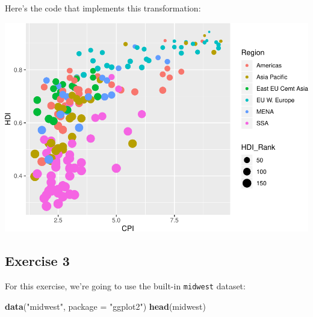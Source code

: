 \documentclass[]{book}
\newenvironment{Shaded}{\begin{snugshade}}{\end{snugshade}}
\newcommand{\DataTypeTok}[1]{\textcolor[rgb]{0.13,0.29,0.53}{#1}}
\newcommand{\KeywordTok}[1]{\textcolor[rgb]{0.13,0.29,0.53}{\textbf{#1}}}
\newcommand{\NormalTok}[1]{#1}
\newcommand{\OperatorTok}[1]{\textcolor[rgb]{0.81,0.36,0.00}{\textbf{#1}}}
\newcommand{\StringTok}[1]{\textcolor[rgb]{0.31,0.60,0.02}{#1}}
\begin{document}
Here's the code that implements this transformation:

\begin{Shaded}
\end{Shaded}

\includegraphics{R/Rgraphics/figures/unnamed-chunk-201-1.pdf}

\hypertarget{exercise-3-2}{%
\subsection{Exercise 3}\label{exercise-3-2}}

For this exercise, we're going to use the built-in \texttt{midwest} dataset:

\begin{Shaded}
\begin{Highlighting}[]
\KeywordTok{data}\NormalTok{(}\StringTok{"midwest"}\NormalTok{, }\DataTypeTok{package =} \StringTok{"ggplot2"}\NormalTok{)}
\KeywordTok{head}\NormalTok{(midwest)}
\end{Highlighting}
\end{Shaded}
\end{document}
